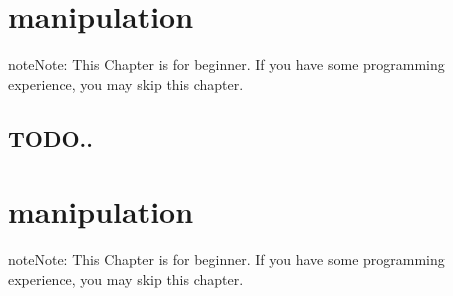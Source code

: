 \documentclass[letterpaper,12pt,english]{sphinxmanual}
\begin{document}
\begin{sphinxVerbatim}[commandchars=\\\{\}]
               
\end{sphinxVerbatim}


\chapter{ manipulation}
\label{\detokenize{pd:pd-dataframe-manipulation}}\label{\detokenize{pd:pd}}\label{\detokenize{pd::doc}}
\begin{sphinxadmonition}{note}{Note:}
\sphinxAtStartPar
This Chapter {\hyperref[\detokenize{nb:nb}]{}} is for beginner.  If you have some  programming
experience, you may skip this chapter.
\end{sphinxadmonition}


\section{TODO..}
\label{\detokenize{pd:todo}}

\chapter{ manipulation}
\label{\detokenize{rdd:rdd-dataframe-manipulation}}\label{\detokenize{rdd:rdd}}\label{\detokenize{rdd::doc}}
\begin{sphinxadmonition}{note}{Note:}
\sphinxAtStartPar
This Chapter {\hyperref[\detokenize{nb:nb}]{}} is for beginner.  If you have some  programming experience, you may skip this chapter.
\end{sphinxadmonition}
\end{document}

